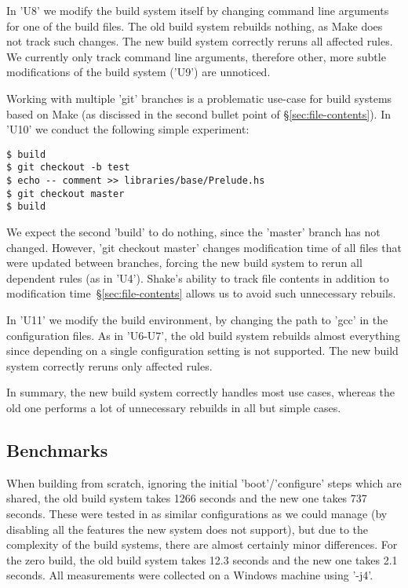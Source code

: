 In \lst'U8' we modify the build system itself by changing command line
arguments for one of the build files. The old build system rebuilds nothing,
as Make does not track such changes. The new build system correctly reruns all
affected rules. We currently only track command line arguments, therefore other,
more subtle modifications of the build system (\lst'U9') are unnoticed.

Working with multiple \lst'git' branches is a problematic use-case for build
systems based on Make (as discissed in the second bullet point of
\S\ref{sec:file-contents}). In \lst'U10' we conduct the following simple
experiment:

\begin{lstlisting}
$ build
$ git checkout -b test
$ echo -- comment >> libraries/base/Prelude.hs
$ git checkout master
$ build
\end{lstlisting}

We expect the second \lst'build' to do nothing, since the \lst'master'
branch has not changed. However, \lst'git checkout master' changes modification
time of all files that were updated between branches, forcing the new
build system to rerun all dependent rules (as in \lst'U4'). Shake's ability to
track file contents in addition to modification time~\S\ref{sec:file-contents}
allows us to avoid such unnecessary rebuils.

In \lst'U11' we modify the build environment, by changing the path to \lst'gcc'
in the configuration files. As in \lst'U6-U7', the old build system rebuilds
almost everything since depending on a single configuration setting is not
supported. The new build system correctly reruns only affected rules.

In summary, the new build system correctly handles most use cases, whereas
the old one performs a lot of unnecessary rebuilds in all but simple cases.

\subsection{Benchmarks\label{sec:benchmarks}}

When building from scratch, ignoring the initial \lst'boot'/\lst'configure'
steps which are shared, the old build system takes 1266 seconds and the new
one takes 737 seconds. These were tested in as similar configurations as we could
manage (by disabling all the features the new system does not support),
but due to the complexity of the build systems, there are almost certainly
minor differences. For the zero build, the old build system takes 12.3
seconds and the new one takes 2.1 seconds. All measurements were collected on a
Windows machine using \lst'-j4'.

